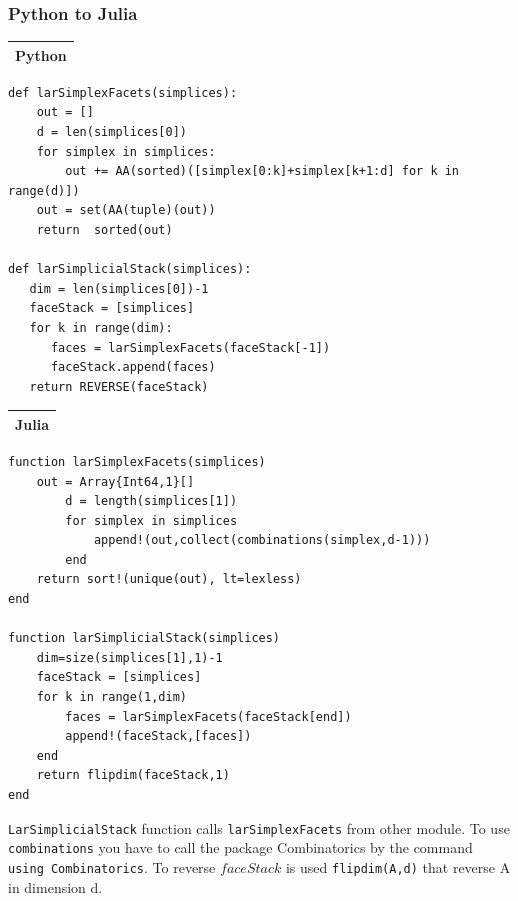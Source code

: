 \documentclass{article}
\begin{document}
\subsubsection{Python to Julia}
\vspace{1ex}
\begin{flushleft} \small
\begin{center}
\begin{tabular}{|p{16cm}|}
\hline
\cellcolor[gray]{.9}Python\\
\hline
\end{tabular}
\end{center}
\vspace{2ex}
\begin{list}{}{} \item
\begin{Verbatim}[tabsize=4]
def larSimplexFacets(simplices):
    out = []
    d = len(simplices[0])
    for simplex in simplices:
        out += AA(sorted)([simplex[0:k]+simplex[k+1:d] for k in range(d)])
    out = set(AA(tuple)(out))
    return  sorted(out)
    
def larSimplicialStack(simplices):
   dim = len(simplices[0])-1
   faceStack = [simplices]
   for k in range(dim):
      faces = larSimplexFacets(faceStack[-1])
      faceStack.append(faces)
   return REVERSE(faceStack)    
\end{Verbatim}
\end{list}
\vspace{2ex}
\begin{center}
\begin{tabular}{|p{16cm}|}
\hline
\cellcolor[gray]{.9}Julia\\
\hline
\end{tabular}
\end{center}
\vspace{2ex}
\begin{list}{}{} \item
   \begin{Verbatim}[tabsize=3]
function larSimplexFacets(simplices)
	out = Array{Int64,1}[]
		d = length(simplices[1])
		for simplex in simplices
			append!(out,collect(combinations(simplex,d-1)))
		end
	return sort!(unique(out), lt=lexless)
end

function larSimplicialStack(simplices)
    dim=size(simplices[1],1)-1   
    faceStack = [simplices]
    for k in range(1,dim)
        faces = larSimplexFacets(faceStack[end])
        append!(faceStack,[faces])
    end
    return flipdim(faceStack,1)
end       
   \end{Verbatim}
\end{list}
\end{flushleft}
\vspace{2ex}
\texttt{LarSimplicialStack} function calls \texttt{larSimplexFacets} from other module. To use \texttt{combinations} you have to call the package Combinatorics by the command \texttt{using Combinatorics}. To reverse $faceStack$ is used \texttt{flipdim(A,d)} that reverse A in dimension d.
\vspace{2ex}
\end{document}
